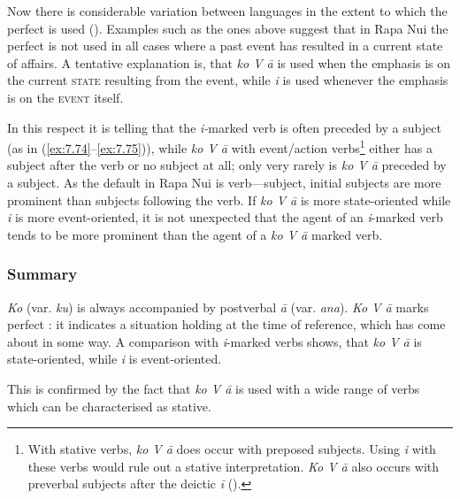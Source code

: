 Now there is considerable variation between languages in the extent to which the perfect is used (\citealt[52–56]{Comrie1976}). Examples such as the ones above suggest that in Rapa Nui the perfect  is not used in all cases where a past event has resulted in a current state of affairs. A tentative explanation is, that \textit{ko V {\ꞌ}ā} is used when the emphasis is on the current \textsc{state} resulting from the event, while \textit{i} is used whenever the emphasis is on the \textsc{event} itself. 

In this respect it is telling that the \textit{i-}marked verb is often preceded by a subject (as in (\ref{ex:7.74}–\ref{ex:7.75})), while \textit{ko V {\ꞌ}ā} with event/action verbs\footnote{\label{fn:336}With stative verbs, \textit{ko V {\ꞌ}ā} does occur with preposed subjects. Using \textit{i} with these verbs would rule out a stative interpretation. \textit{Ko V {\ꞌ}ā} also occurs with preverbal subjects after the deictic  \textit{{\ꞌ}ī} ().} either has a subject after the verb or no subject at all; only very rarely is \textit{ko V {\ꞌ}ā} preceded by a subject. As the default  in Rapa Nui is verb—subject, initial subjects are more prominent than subjects following the verb. If \textit{ko V {\ꞌ}ā} is more state-oriented while \textit{i} is more event-oriented, it is not unexpected that the agent of an \textit{i}{}-marked verb tends to be more prominent than the agent of a \textit{ko V {\ꞌ}ā} marked verb.

\subsubsection{Summary}\label{sec:7.2.7.5}

\textit{Ko} (var. \textit{ku}) is always accompanied by postverbal \textit{{\ꞌ}ā} (var. \textit{{\ꞌ}ana}). \textit{Ko V {\ꞌ}ā} marks perfect : it indicates a situation holding at the time of reference, which has come about in some way. A comparison with \textit{i}{}-marked verbs shows, that \textit{ko V {\ꞌ}ā} is state-oriented, while \textit{i} is event-oriented. 

This is confirmed by the fact that \textit{ko V {\ꞌ}ā} is used with a wide range of verbs which can be characterised as stative.
 
